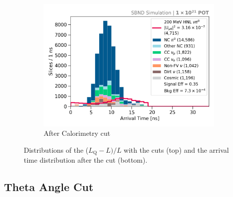 \begin{figure}[hb!]
\begin{subfigure}[b]{0.495\textwidth}
            \includegraphics[width=\textwidth]{beam_bucket_postopt0}
            \caption{After Calorimetry cut}%
	    \label{fig:bb_opt0}
        \end{subfigure}
	\caption[Calorimetry Cut]{
	Distributions of the ($L_{\mathrm{Q}} - L)/L$ with the cuts (top) and the arrival time distribution after the cut (bottom). 
	}
        \label{fig:opt0_cut}
\end{figure}

\subsection{Theta Angle Cut}
\label{sec:theta_cut}

